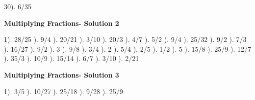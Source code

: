 \documentclass{article}%
\begin{document}
30). 6/35%
\newline%
\newpage%
\large%
\begin{center}%
\textbf{Multiplying Fractions- Solution 2}%
\newline%
\end{center} \normalsize%
1). 28/25%
). 9/4%
). 20/21%
). 3/10%
). 20/3%
). 4/7%
). 5/2%
). 9/4%
). 25/32%
). 9/2%
). 7/3%
). 16/27%
). 9/2%
). 3%
). 9/8%
). 3/4%
). 2%
). 5/4%
). 2/5%
). 1/2%
). 5%
). 15/8%
). 25/9%
). 12/7%
). 35/3%
). 10/9%
). 15/14%
). 6/7%
). 3/10%
). 2/21%
\newline%
\newpage%
\large%
\begin{center}%
\textbf{Multiplying Fractions- Solution 3}%
\newline%
\end{center} \normalsize%
1). 3/5%
). 10/27%
). 25/18%
). 9/28%
). 25/9%
\newline%
\end{document}
